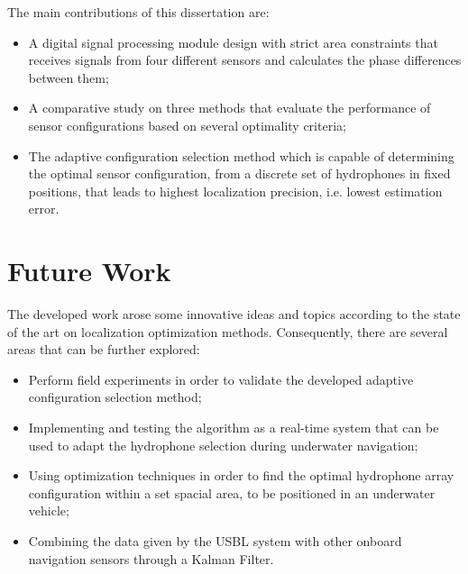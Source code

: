 The main contributions of this dissertation are: 
\begin{itemize}
	\item A digital signal processing module design with strict area constraints that receives signals from four different sensors and calculates the phase differences between them;
	
	\item A comparative study on three methods that evaluate the performance of sensor configurations based on several optimality criteria;
	
	\item The adaptive configuration selection method which is capable of determining the optimal sensor configuration, from a discrete set of hydrophones in fixed positions, that leads to highest localization precision, i.e. lowest estimation error.
\end{itemize}


\section{Future Work}

The developed work arose some innovative ideas and topics according to the state of the art on localization optimization methods. Consequently, there are several areas that can be further explored:

\begin{itemize}
	
	\item Perform field experiments in order to validate the developed adaptive configuration selection method;
		
	\item Implementing and testing the algorithm as a real-time system that can be used to adapt the hydrophone selection during underwater navigation;
	
	\item Using optimization techniques in order to find the optimal hydrophone array configuration within a set spacial area, to be positioned in an underwater vehicle;
	
	\item Combining the data given by the USBL system with other onboard navigation sensors through a Kalman Filter.
	
\end{itemize}